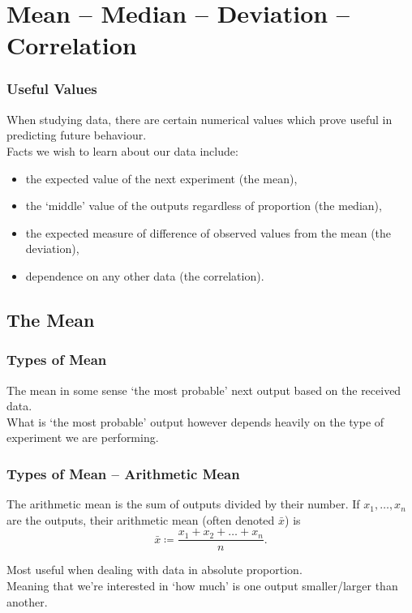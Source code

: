 \documentclass[aspectratio=169,11pt,svgnames]{beamer}
\begin{document}
\section{Mean -- Median -- Deviation -- Correlation}

\begin{frame}
 \frametitle{Useful Values}
 When studying data, there are \alert{certain numerical values} which prove
 useful in predicting future behaviour.\\
 \pause
 Facts we wish to learn about our data include:
 \pause
 \begin{itemize}[label=\textbullet]
  \item the expected value of the next experiment (the \alert{mean}),
  \pause
  \item the `middle' value of the outputs regardless of proportion (the
   \alert{median}),
  \pause
  \item the expected measure of difference of observed values from the mean (the
   \alert{deviation}),
  \pause
  \item dependence on any other data (the \alert{correlation}).
 \end{itemize}
\end{frame}

\subsection{The Mean}

\begin{frame}
 \subsectionpage
\end{frame}

\begin{frame}
 \frametitle{Types of Mean}
 The \alert{mean} in some sense `the most probable' next output based on the
 received data.\\
 \pause
 What is `the most probable' output however depends heavily on the type of
 experiment we are performing.\\
\end{frame}

\begin{frame}
 \frametitle{Types of Mean -- Arithmetic Mean}
 \begin{tcolorbox}[title=Arithmetic Mean]
  The \alert{arithmetic mean} is the sum of outputs divided by their number. If
  $x_1,\ldots,x_n$ are the outputs, their arithmetic mean (often denoted
  $\bar{x}$) is
  \[
   \bar{x} \coloneqq \frac{x_1+x_2+\ldots +x_n}{n}.
  \]
 \end{tcolorbox}
 \pause
 Most useful when dealing with data in \alert{absolute} proportion.\\
 \pause
 Meaning that we're interested in `\alert{how much}' is one output
 smaller/larger than another.
\end{frame}
\end{document}
